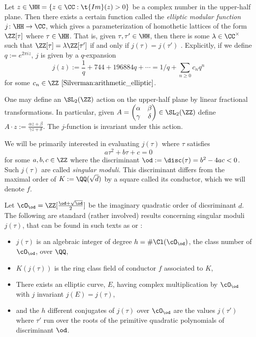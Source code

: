\documentclass[11pt, proquest]{uwthesis}
\begin{document}
Let $z\in\HH = \{z\in \CC:\t{Im}(z) > 0\}$ be a complex number in the upper-half plane.
Then there exists a certain function called the {\it elliptic modular function} $j\colon\HH\to \CC$, which gives a parameterization of homothetic lattices of the form $\ZZ[\tau]$ where $\tau\in\HH$.
That is, given $\tau,\tau'\in\HH$, then there is some $\lambda\in\CC^\times$ such that $\ZZ[\tau] = \lambda \ZZ[\tau']$ if and only if $j(\tau) = j(\tau')$ \cite[Thm~4]{Lang:elliptic_functions}.
Explicitly, if we define $q := e^{2\pi i z}$, $j$ is given by a $q$-expansion
$$j(z):= \frac{1}{q} + 744 + 196884q + \cdots = 1/q + \sum_{n\geq 0} c_n q^n$$
for some $c_n\in\ZZ$ $\cite{Silverman:arithmetic_elliptic}$.

One may define an $\SL_2(\ZZ)$ action on the upper-half plane by linear fractional transformations. In particular, given $A = \begin{pmatrix}\alpha&\beta\\ \gamma&\delta\end{pmatrix}\in\SL_2(\ZZ)$ define $A \cdot z := \frac{\alpha z + \beta}{\gamma z + \delta}$.
The $j$-function is invariant under this action. %

We will be primarily interested in evaluating $j(\tau)$ where $\tau$ satisfies
$$a\tau^2 + b\tau + c =0$$
for some $a,b,c\in\ZZ$ where the discriminant $\od := \disc(\tau) = b^2-4ac < 0$.
Such $j(\tau)$ are called {\it singular moduli}.
This discriminant differs from the maximal order of $K:= \QQ(\sqrt{d})$ by a square \cite[Proposition 6.2.6]{Stein:number_theory} called its conductor, which we will denote $f$.

Let $\cO_\od = \ZZ[\frac{\od + \sqrt{\od}}{2}]$ be the imaginary quadratic order of dicsriminant $d$. The following are standard (rather involved) results concerning singular moduli $j(\tau)$, that can be found in such texts as \cite[Thm~10.23,]{Cox:primes_of_the_form} or \cite[Thm~6.10]{Neukirch:Number_Theory}:

\begin{itemize}
  \item $j(\tau)$ is an algebraic integer of degree $h= \#\Cl(\cO_\od)$, the class number of $\cO_\od$, over $\QQ$,
  \item $K(j(\tau))$ is the ring class field of conductor $f$ associated to $K$,
  \item There exists an elliptic curve, $E$, having complex multiplication by $\cO_\od$ with $j$ invariant $j(E) =j(\tau)$,
  \item and the $h$ different conjugates of $j(\tau)$ over $\cO_\od$ are the values $j(\tau')$ where $\tau'$ run over the roots of the primitive quadratic polynomials of discriminant $\od$.
\end{itemize}
\end{document}
